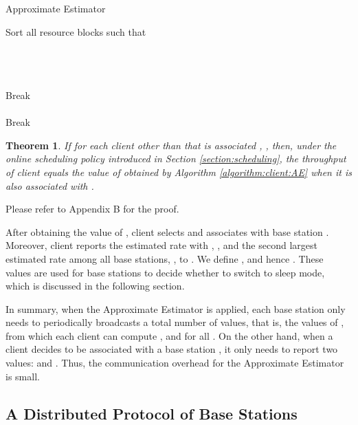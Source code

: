\documentclass[conference]{IEEEtran}
\newtheorem{theorem}{\textbf{Theorem}}
\begin{document}
\begin{algorithm}[t]
\caption{Approximate Estimator} \label{algorithm:client:AE}
\begin{algorithmic}[1]
\STATE Sort all resource blocks such that
\\
\STATE 
\STATE 
\STATE \\
\FOR{}

\IF{}
\STATE \\
\STATE \\
\STATE 
\ELSIF{}
\STATE Break \ELSE
\STATE \\
\STATE \\
\STATE  \STATE Break \ENDIF
\ENDFOR
\RETURN 
\end{algorithmic}
\end{algorithm}



\begin{theorem} \label{theorem:client:AE}
If for each client  other than  that is associated ,
, then, under the online scheduling
policy introduced in Section \ref{section:scheduling}, the
throughput of client  equals the value of  obtained by
Algorithm \ref{algorithm:client:AE} when it is also associated with
.
\end{theorem}

\begin{IEEEproof}
Please refer to Appendix B for the proof.
\end{IEEEproof}

After obtaining the value of , client  selects  and associates with base station . Moreover, client  reports the estimated rate with , , and the second largest estimated rate among all base stations, , to . We define , and hence . These values are used for base stations to decide whether to switch to sleep mode, which is discussed in the following section.

In summary, when the Approximate Estimator is applied, each base station  only needs to periodically broadcasts a total number of  values, that is, the values of , from which each client  can compute , and  for all . On the other hand, when a client  decides to be associated with a base station , it only needs to report two values:  and . Thus, the communication overhead for the Approximate Estimator is small.

\subsection{A Distributed Protocol of Base Stations}
\end{document}
